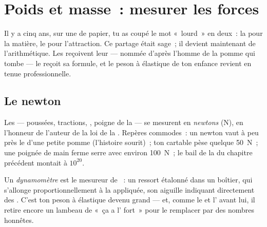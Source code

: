 \chapter{Poids et masse~: mesurer les forces}\label{ch:g9:weight-vs-mass}

Il y a cinq ans, sur une  de papier, tu as coupé le mot «~lourd~»
en deux~: la  pour la matière, le  pour l'attraction. Ce
partage était sage~; il devient maintenant de l'arithmétique. Les
 reçoivent leur  --- nommée d'après l'homme de la pomme qui
tombe --- le  reçoit sa formule, et le peson à élastique de ton
enfance revient en tenue professionnelle.

\section{Le newton}

\begin{definition}[Le newton]\label{def:g9:weight-vs-mass:newton}
Les  --- poussées, tractions, , poigne de la 
--- se mesurent en \emph{newtons} (\unit{N}), en
l'honneur de l'auteur de la loi de la . Repères
commodes~: un newton vaut à peu près le  d'une petite pomme
(l'histoire sourit)~; ton cartable pèse quelque \qty{50}{N}~; une
poignée de main ferme serre avec environ \qty{100}{N}~; le bail de la
 du chapitre précédent montait à $10^{20}$.
\end{definition}

\begin{definition}[Dynamomètre]\label{def:g9:weight-vs-mass:dynamometer}
Un \emph{dynamomètre} est le mesureur de ~:
un ressort étalonné dans un boîtier, qui s'allonge proportionnellement
à la  appliquée, son aiguille indiquant directement des .
C'est ton peson à élastique devenu grand --- et, comme le  et
l' avant lui, il retire encore un lambeau de «~ça a l'
fort~» pour le remplacer par des nombres honnêtes.
\end{definition}

